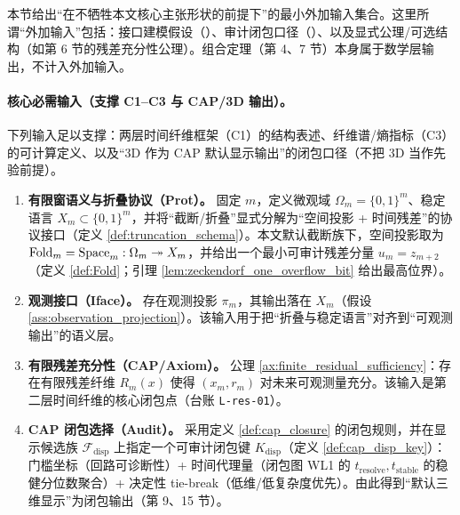 \AuditTag 本节给出“在不牺牲本文核心主张形状的前提下”的最小外加输入集合。这里所谓“外加输入”包括：接口建模假设（\InterfaceTag）、审计闭包口径（\AuditTag）、以及显式公理/可选结构（如第 6 节的残差充分性公理）。组合定理（第 4、7 节）本身属于数学层输出，不计入外加输入。\par

\paragraph{核心必需输入（支撑 C1--C3 与 CAP/3D 输出）。}
\AuditTag 下列输入足以支撑：两层时间纤维框架（C1）的结构表述、纤维谱/熵指标（C3）的可计算定义、以及“3D 作为 CAP 默认显示输出”的闭包口径（不把 3D 当作先验前提）。
\begin{enumerate}
  \item \textbf{有限窗语义与折叠协议（Prot）。}
  固定 $m$，定义微观域 $\Omega_m=\{0,1\}^m$、稳定语言 $X_m\subset\{0,1\}^m$，并将“截断/折叠”显式分解为“空间投影 + 时间残差”的协议接口（定义 \ref{def:truncation_schema}）。本文默认截断族下，空间投影取为 $\mathrm{Fold}_m=\mathrm{Space}_m:\Omega_m\twoheadrightarrow X_m$，并给出一个最小可审计残差分量 $u_m=z_{m+2}$（定义 \ref{def:Fold}；引理 \ref{lem:zeckendorf_one_overflow_bit} 给出最高位界）。
  \item \textbf{观测接口（Iface）。}
  存在观测投影 $\pi_m$，其输出落在 $X_m$（假设 \ref{ass:observation_projection}）。该输入用于把“折叠与稳定语言”对齐到“可观测输出”的语义层。
  \item \textbf{有限残差充分性（CAP/Axiom）。}
  公理 \ref{ax:finite_residual_sufficiency}：存在有限残差纤维 $R_m(x)$ 使得 $(x_m,r_m)$ 对未来可观测量充分。该输入是第二层时间纤维的核心闭包点（台账 \texttt{L-res-01}）。
  \item \textbf{CAP 闭包选择（Audit）。}
  采用定义 \ref{def:cap_closure} 的闭包规则，并在显示候选族 $\mathcal F_{\mathrm{disp}}$ 上指定一个可审计闭包键 $K_{\mathrm{disp}}$（定义 \ref{def:cap_disp_key}）：门槛坐标（回路可诊断性）+ 时间代理量（闭包图 WL1 的 $t_{\mathrm{resolve}},t_{\mathrm{stable}}$ 的稳健分位数聚合）+ 决定性 tie-break（低维/低复杂度优先）。由此得到“默认三维显示”为闭包输出（第 9、15 节）。
\end{enumerate}


